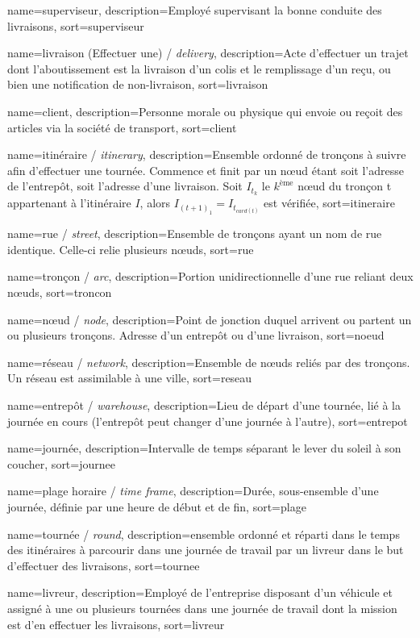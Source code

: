 {
	name={superviseur},
	description={Employé supervisant la bonne conduite des livraisons},
	sort={superviseur}
}

{
	name={livraison (Effectuer une) / \textit{delivery}},
	description={Acte d'effectuer un trajet dont l'aboutissement est la livraison d'un colis et le remplissage d'un reçu, ou bien une notification de non-livraison},
	sort={livraison}
}

{
	name={client},
	description={Personne morale ou physique qui envoie ou reçoit des articles via la société de transport},
	sort={client}
}

{
	name={itinéraire / \textit{itinerary}},
	description={Ensemble ordonné de tronçons à suivre afin d'effectuer une tournée. Commence et finit par un nœud étant soit l'adresse de l'entrepôt, soit l'adresse d'une livraison. Soit $I_{t_k}$ le $k^\text{ème}$ nœud du tronçon t appartenant à l'itinéraire $I$, alors $I_{{(t+1)}_{1}} = I_{{t}_{card(t)}}$ est vérifiée},
	sort={itineraire}
}

{
	name={rue / \textit{street}},
	description={Ensemble de tronçons ayant un nom de rue identique. Celle-ci relie plusieurs nœuds},
	sort={rue}
}

{
	name={tronçon / \textit{arc}},
	description={Portion unidirectionnelle d'une rue reliant deux nœuds},
	sort={troncon}
}

{
	name={nœud / \textit{node}},
	description={Point de jonction duquel arrivent ou partent un ou plusieurs tronçons. Adresse d'un entrepôt ou d'une livraison},
	sort={noeud}
}

{
	name={réseau / \textit{network}},
	description={Ensemble de nœuds reliés par des tronçons. Un réseau est assimilable à une ville},
	sort={reseau}
}

{
	name={entrepôt / \textit{warehouse}},
	description={Lieu de départ d'une tournée, lié à la journée en cours (l'entrepôt peut changer d'une journée à l'autre)},
	sort={entrepot}
}

{
	name={journée},
	description={Intervalle de temps séparant le lever du soleil à son coucher},
	sort={journee}
}

{
	name={plage horaire} / \textit{time frame},
	description={Durée, sous-ensemble d'une journée, définie par une heure de début et de fin},
	sort={plage}
}

{
	name={tournée / \textit{round}},
	description={ensemble ordonné et réparti dans le temps des itinéraires à parcourir dans une journée de travail par un livreur dans le but d'effectuer des livraisons},
	sort={tournee}
}

{
	name={livreur},
	description={Employé de l'entreprise disposant d'un véhicule et assigné à une ou plusieurs tournées dans une journée de travail dont la mission est d'en effectuer les livraisons},
	sort={livreur}
}
